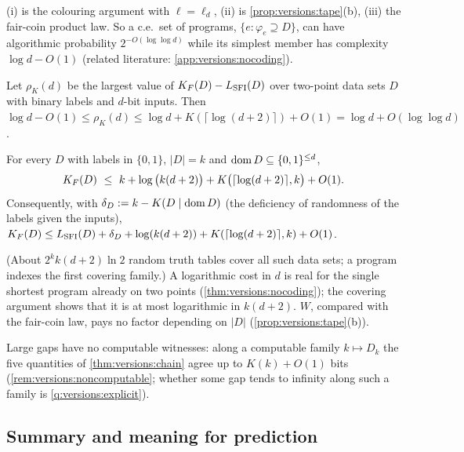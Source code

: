 (i) is the colouring argument with $\ell=\ell_d$, (ii) is \cref{prop:versions:tape}(b), (iii) the fair-coin product law. So a c.e.\ set of programs, $\{e:\varphi_e\supseteq D\}$, can have algorithmic probability $2^{-O(\log\log d)}$ while its simplest member has complexity $\log d-O(1)$ (related literature: \cref{app:versions:nocoding}).

\begin{corollary}\label{cor:versions:twopoint}
Let $\rho_K(d)$ be the largest value of $K_{F}(D)-L_{\mathrm{SFI}}(D)$ over two-point data sets $D$ with binary labels and $d$-bit inputs. Then $\log d-O(1)\le\rho_K(d)\le\log d+K(\lceil\log(d+2)\rceil)+O(1)=\log d+O(\log\log d)$.
\end{corollary}

\begin{proposition}\label{prop:versions:covering}
For every $D$ with labels in $\{0,1\}$, $|D|=k$ and $\operatorname{dom} D\subseteq\{0,1\}^{\le d}$,
\[
\KF(D)\ \le\ k+\log\big(k(d+2)\big)+K\big(\lceil\log(d+2)\rceil,k\big)+O(1).
\]
Consequently, with $\delta_D:=k-K(D\mid\operatorname{dom} D)$ (the deficiency of randomness of the labels given the inputs), $K_{F}(D)\le L_{\mathrm{SFI}}(D)+\delta_D+\log(k(d+2))+K(\lceil\log(d+2)\rceil,k)+O(1)$.
\end{proposition}

(About $2^kk(d+2)\ln2$ random truth tables cover all such data sets; a program indexes the first covering family.) A logarithmic cost in $d$ is real for the single shortest program already on two points (\cref{thm:versions:nocoding}); the covering argument shows that it is at most logarithmic in $k(d+2)$. $W$, compared with the fair-coin law, pays no factor depending on $|D|$ (\cref{prop:versions:tape}(b)).

Large gaps have no computable witnesses: along a computable family $k\mapsto D_k$ the five quantities of \cref{thm:versions:chain} agree up to $K(k)+O(1)$ bits (\cref{rem:versions:noncomputable}; whether some gap tends to infinity along such a family is \cref{q:versions:explicit}).

\subsection{Summary and meaning for prediction}\label{sec:versions:table}

